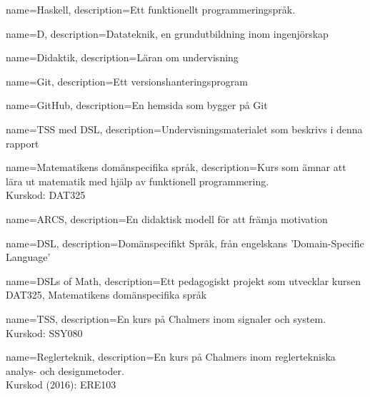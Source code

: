 
{
	name=Haskell,
	description={Ett funktionellt programmeringspråk.}
}

{
    name=D,
    description={Datateknik, en grundutbildning inom ingenjörskap}
}

{
    name=Didaktik,
    description={Läran om undervisning}
}

{
    name=Git,
    description={Ett versionshanteringsprogram}
}

{
    name=GitHub,
    description={En hemsida som bygger på Git}
}

{
    name={TSS med DSL},
    description={Undervisningsmaterialet som beskrivs i denna rapport}
}

{
    name={Matematikens domänspecifika språk},
    description={Kurs som ämnar att lära ut matematik med hjälp av funktionell programmering. \\
    Kurskod: DAT325}
}

{
    name=ARCS,
    description={En didaktisk modell för att främja motivation}
}

{
    name=DSL,
    description={Domänspecifikt Språk, från engelskans 'Domain-Specific Language'}
}

{
    name={DSLs of Math},
    description={Ett pedagogiskt projekt som utvecklar kursen DAT325, Matematikens domänspecifika språk}
}

{
    name={TSS},
    description={En kurs på Chalmers inom signaler och system. \\ Kurskod: SSY080}
}

{
    name={Reglerteknik},
    description={En kurs på Chalmers inom reglertekniska analys- och designmetoder.\\
    Kurskod (2016): ERE103}
}





